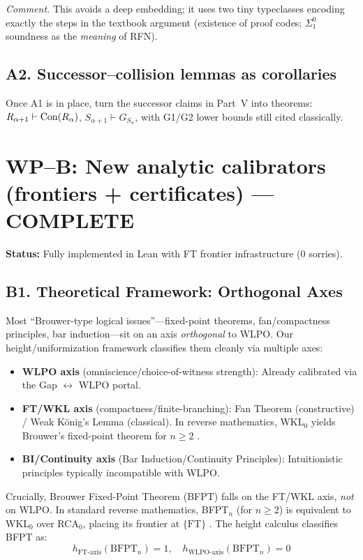 \documentclass[11pt]{article}
\theoremstyle{definition}
\theoremstyle{remark}
\newcommand{\FT}{\mathrm{FT}}
\begin{document}
\emph{Comment.} This avoids a deep embedding; it uses two tiny typeclasses encoding exactly the steps in the textbook argument (existence of proof codes; $\Sigma^0_1$ soundness as the \emph{meaning} of RFN).

\subsection{A2. Successor–collision lemmas as corollaries}
Once A1 is in place, turn the successor claims in Part~V into theorems: 
\(
R_{\alpha+1}\vdash \mathrm{Con}(R_\alpha)\), 
\(S_{\alpha+1}\vdash G_{S_\alpha}\),
with G1/G2 lower bounds still cited classically.

\section{WP–B: New analytic calibrators (frontiers + certificates) — \textbf{\color{green}COMPLETE}}

\textbf{Status:} Fully implemented in Lean with FT frontier infrastructure (0 sorries).

\subsection{B1. Theoretical Framework: Orthogonal Axes}

Most ``Brouwer-type logical issues''—fixed-point theorems, fan/compactness principles, bar induction—sit on an axis \emph{orthogonal} to WLPO. Our height/uniformization framework classifies them cleanly via multiple axes:

\begin{itemize}
\item \textbf{WLPO axis} (omniscience/choice-of-witness strength): Already calibrated via the Gap $\leftrightarrow$ WLPO portal.
\item \textbf{FT/WKL axis} (compactness/finite-branching): Fan Theorem (constructive) / Weak König's Lemma (classical). In reverse mathematics, WKL$_0$ yields Brouwer's fixed-point theorem for $n \geq 2$ \cite{Hirst-BFPT}.
\item \textbf{BI/Continuity axis} (Bar Induction/Continuity Principles): Intuitionistic principles typically incompatible with WLPO.
\end{itemize}

Crucially, Brouwer Fixed-Point Theorem (BFPT) falls on the FT/WKL axis, \emph{not} on WLPO. In standard reverse mathematics, BFPT$_n$ (for $n \geq 2$) is equivalent to WKL$_0$ over RCA$_0$, placing its frontier at $\{\FT\}$ \cite{Shioji-Tanaka}. The height calculus classifies BFPT as:
\[h_{\text{FT-axis}}(\text{BFPT}_n) = 1, \quad h_{\text{WLPO-axis}}(\text{BFPT}_n) = 0\]
\end{document}

